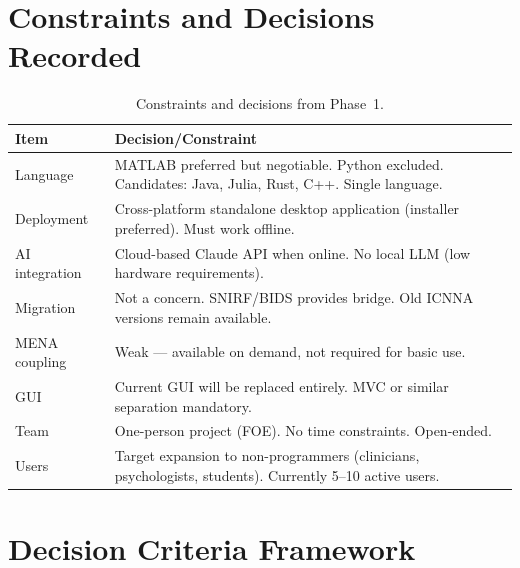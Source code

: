 \documentclass[11pt,a4paper]{article}
\begin{document}
\section{Constraints and Decisions Recorded}

\begin{table}[h]
\centering
\begin{tabular}{lp{10cm}}
\toprule
\textbf{Item} & \textbf{Decision/Constraint} \\
\midrule
Language & MATLAB preferred but negotiable. Python excluded. Candidates: Java, Julia, Rust, C++. Single language. \\
Deployment & Cross-platform standalone desktop application (installer preferred). Must work offline. \\
AI integration & Cloud-based Claude API when online. No local LLM (low hardware requirements). \\
Migration & Not a concern. SNIRF/BIDS provides bridge. Old ICNNA versions remain available. \\
MENA coupling & Weak --- available on demand, not required for basic use. \\
GUI & Current GUI will be replaced entirely. MVC or similar separation mandatory. \\
Team & One-person project (FOE). No time constraints. Open-ended. \\
Users & Target expansion to non-programmers (clinicians, psychologists, students). Currently 5--10 active users. \\
\bottomrule
\end{tabular}
\caption{Constraints and decisions from Phase~1.}
\end{table}

\section{Decision Criteria Framework}
\end{document}
